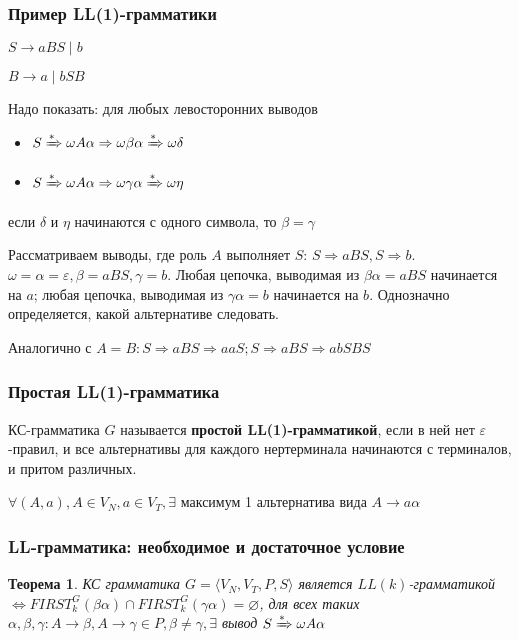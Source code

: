 \documentclass{beamer}
\newtheorem{rutheorem}{Теорема}
\newcommand{\derive}[0]{\xRightarrow[]{*}}
\begin{document}
\begin{frame}[fragile]
  \transwipe[direction=90]
  \frametitle{Пример LL(1)-грамматики}
  $S \to a B S \mid b$

  $B \to a \mid b S B$

  Надо показать: для любых левосторонних выводов
  \begin{itemize}
    \item $S \derive \omega A \alpha \Rightarrow \omega \beta \alpha \derive \omega \delta$
    \item $S \derive \omega A \alpha \Rightarrow \omega \gamma \alpha \derive \omega \eta$
  \end{itemize}
  если $\delta$ и $\eta$ начинаются с одного символа, то $\beta = \gamma$

  Рассматриваем выводы, где роль $A$ выполняет $S$: $S \Rightarrow a B S, S \Rightarrow b$. $\omega = \alpha = \varepsilon, \beta = a B S, \gamma = b$. Любая цепочка, выводимая из $\beta \alpha = a B S$ начинается на $a$; любая цепочка, выводимая из $\gamma \alpha = b$ начинается на $b$. Однозначно определяется, какой альтернативе следовать.

  Аналогично с $A = B: S \Rightarrow a B S \Rightarrow a a S; S \Rightarrow a B S \Rightarrow a b S B S$
\end{frame}


\begin{frame}[fragile]
  \transwipe[direction=90]
  \frametitle{Простая LL(1)-грамматика}
  КС-грамматика $G$ называется \textbf{простой LL(1)-грамматикой}, если в ней нет $\varepsilon$-правил, и все альтернативы для каждого нертерминала начинаются с терминалов, и притом различных.

  \vfill

  $\forall (A, a), A \in V_N, a \in V_T, \exists $ максимум 1 альтернатива вида $A \to a \alpha$

\end{frame}


\begin{frame}[fragile]
  \transwipe[direction=90]
  \frametitle{LL-грамматика: необходимое и достаточное условие}
  \begin{rutheorem}
  КС грамматика $G = \langle V_N, V_T, P, S \rangle$ является $LL(k)$-грамматикой $\Leftrightarrow FIRST^G_k(\beta \alpha) \cap FIRST^G_k(\gamma \alpha) = \varnothing$, для всех таких $\alpha, \beta, \gamma: A \to \beta, A \to \gamma \in P, \beta \neq \gamma, \exists$ вывод $S \derive \omega A \alpha$
  \end{rutheorem}

\end{frame}
\end{document}
